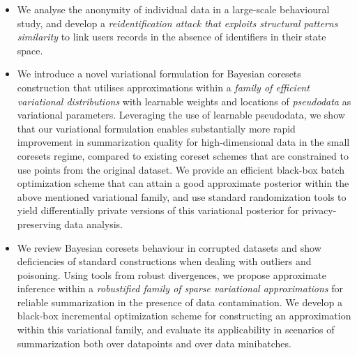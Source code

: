 \begin{itemize}
	\item We analyse the anonymity of individual data in a large-scale behavioural study, and develop a \emph{reidentification attack that exploits structural patterns similarity} to link users records in the absence of identifiers in their state space.
	\item We introduce a novel variational formulation for Bayesian coresets construction that utilises approximations within a \emph{family of efficient variational distributions} with learnable weights and locations of \emph{pseudodata} as variational parameters.
	 Leveraging the use of learnable pseudodata, we show that our variational formulation enables substantially more rapid improvement in summarization quality for high-dimensional data in the small coresets regime, compared to existing coreset schemes that are constrained to use points from the original dataset. 
	 We provide an efficient black-box batch optimization scheme that can attain a good approximate posterior within the above mentioned variational family, and use standard randomization tools to yield differentially private versions of this variational posterior for privacy-preserving data analysis.
	\item We review Bayesian coresets behaviour in corrupted datasets and show deficiencies of standard constructions when dealing with outliers and poisoning.
	 Using tools from robust divergences, we propose approximate inference within a \emph{robustified family of sparse variational approximations} for reliable summarization in the presence of data contamination.
	 We develop a black-box incremental optimization scheme for constructing an approximation within this variational family, and evaluate its applicability in scenarios of summarization both over datapoints and over data minibatches.
\end{itemize}

